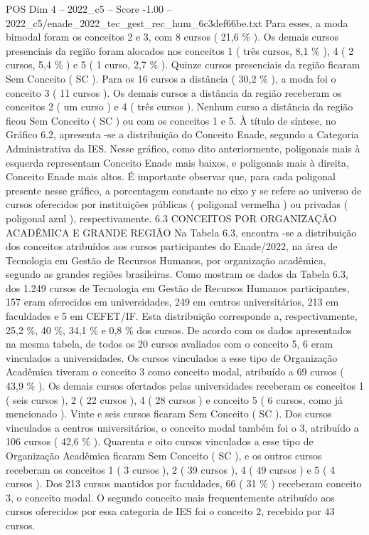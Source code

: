 \begin{textsample}{POS Dim 4 – 2022\_c5 – Score -1.00 – 2022\_c5/enade\_2022\_tec\_gest\_rec\_hum\_6c3def66be.txt}
Para esses, a moda bimodal foram os conceitos 2 e 3, com 8 cursos ( 21,6 \% ).
Os demais cursos presenciais da região foram alocados nos conceitos 1 ( três cursos, 8,1 \% ), 4 ( 2 cursos, 5,4 \% ) e 5 ( 1 curso, 2,7 \% ).
Quinze cursos presenciais da região ficaram Sem Conceito ( SC ).
Para os 16 cursos a distância ( 30,2 \% ), a moda foi o conceito 3 ( 11 cursos ).
Os demais cursos a distância da região receberam os conceitos 2 ( um curso ) e 4 ( três cursos ).
Nenhum curso a distância da região ficou Sem Conceito ( SC ) ou com os conceitos 1 e 5.
À título de síntese, no Gráfico 6.2, apresenta -se a distribuição do Conceito Enade, segundo a Categoria Administrativa da IES.
Nesse gráfico, como dito anteriormente, poligonais mais à esquerda representam Conceito Enade mais baixos, e poligonais mais à direita, Conceito Enade mais altos.
É importante observar que, para cada poligonal presente nesse gráfico, a porcentagem constante no eixo y se refere ao universo de cursos oferecidos por instituições públicas ( poligonal vermelha ) ou privadas ( poligonal azul ), respectivamente. 6.3 CONCEITOS POR ORGANIZAÇÃO ACADÊMICA E GRANDE REGIÃO Na Tabela 6.3, encontra -se a distribuição dos conceitos atribuídos aos cursos participantes do Enade/2022, na área de Tecnologia em Gestão de Recursos Humanos, por organização acadêmica, segundo as grandes regiões brasileiras.
Como mostram os dados da Tabela 6.3, dos 1.249 cursos de Tecnologia em Gestão de Recursos Humanos participantes, 157 eram oferecidos em universidades, 249 em centros universitários, 213 em faculdades e 5 em CEFET/IF.
Esta distribuição corresponde a, respectivamente, 25,2 \%, 40 \%, 34,1 \% e 0,8 \% dos cursos.
De acordo com os dados apresentados na mesma tabela, de todos os 20 cursos avaliados com o conceito 5, 6 eram vinculados a universidades.
Os cursos vinculados a esse tipo de Organização Acadêmica tiveram o conceito 3 como conceito modal, atribuído a 69 cursos ( 43,9 \% ).
Os demais cursos ofertados pelas universidades receberam os conceitos 1 ( seis cursos ), 2 ( 22 cursos ), 4 ( 28 cursos ) e conceito 5 ( 6 cursos, como já mencionado ).
Vinte e seis cursos ficaram Sem Conceito ( SC ).
Dos cursos vinculados a centros universitários, o conceito modal também foi o 3, atribuído a 106 cursos ( 42,6 \% ).
Quarenta e oito cursos vinculados a esse tipo de Organização Acadêmica ficaram Sem Conceito ( SC ), e os outros cursos receberam os conceitos 1 ( 3 cursos ), 2 ( 39 cursos ), 4 ( 49 cursos ) e 5 ( 4 cursos ).
Dos 213 cursos mantidos por faculdades, 66 ( 31 \% ) receberam conceito 3, o conceito modal.
O segundo conceito mais frequentemente atribuído aos cursos oferecidos por essa categoria de IES foi o conceito 2, recebido por 43 cursos.

\end{textsample}
